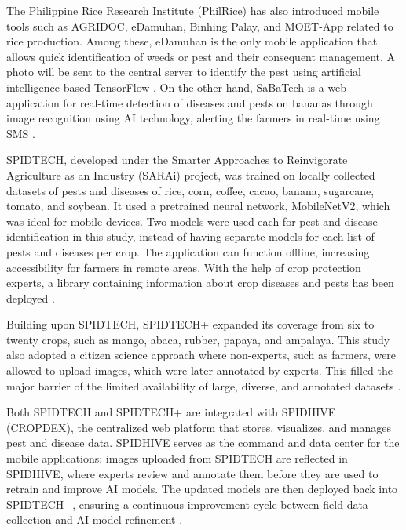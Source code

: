 \documentclass{icsthesis}
\begin{document}
\begin{mainmatter}
            The Philippine Rice Research Institute (PhilRice) has also introduced mobile tools such as AGRIDOC, eDamuhan, Binhing Palay, and MOET-App related to rice production. Among these, eDamuhan is the only mobile application that allows quick identification of weeds or pest and their consequent management. A photo will be sent to the central server to identify the pest using artificial intelligence-based TensorFlow \cite{tallada-2020}. On the other hand, SaBaTech is a web application for real-time detection of diseases and pests on bananas through image recognition using AI technology, alerting the farmers in real-time using SMS \cite{magnaye-2025}.

            SPIDTECH, developed under the Smarter Approaches to Reinvigorate Agriculture as an Industry (SARAi) project, was trained on locally collected datasets of pests and diseases of rice, corn, coffee, cacao, banana, sugarcane, tomato, and soybean. It used a pretrained neural network, MobileNetV2, which was ideal for mobile devices. Two models were used each for pest and disease identification in this study, instead of having separate models for each list of pests and diseases per crop. The application can function offline, increasing accessibility for farmers in remote areas. With the help of crop protection experts, a library containing information about crop diseases and pests has been deployed \cite{Guiam_Gutierrez_Gapasin_Matalog_Ebuenga_2021}.

            Building upon SPIDTECH, SPIDTECH+ \cite{belleza-2025} expanded its coverage from six to twenty crops, such as mango, abaca, rubber, papaya, and ampalaya. This study also adopted a citizen science approach where non-experts, such as farmers, were allowed to upload images, which were later annotated by experts. This filled the major barrier of the limited availability of large, diverse, and annotated datasets \cite{raouhi-2022}.

            Both SPIDTECH and SPIDTECH+ are integrated with SPIDHIVE (CROPDEX), the centralized web platform that stores, visualizes, and manages pest and disease data. SPIDHIVE serves as the command and data center for the mobile applications: images uploaded from SPIDTECH are reflected in SPIDHIVE, where experts review and annotate them before they are used to retrain and improve AI models. The updated models are then deployed back into SPIDTECH+, ensuring a continuous improvement cycle between field data collection and AI model refinement \cite{masicat-2025, belleza-2025, Guiam_Gutierrez_Gapasin_Matalog_Ebuenga_2021}.


\end{mainmatter}
\end{document}
